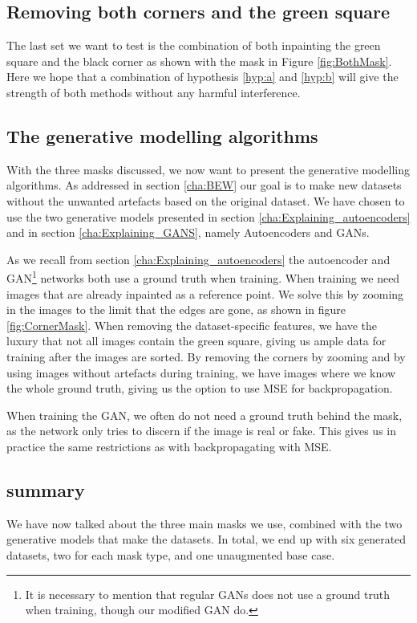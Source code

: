 \subsection{Removing both corners and the green square}
The last set we want to test is the combination of both inpainting the green square and the black corner as shown with the mask in Figure \ref{fig:BothMask}. 
Here we hope that a combination of hypothesis \ref{hyp:a} and \ref{hyp:b} will give the strength of both methods without any harmful interference. 


\subsection{The generative modelling algorithms}
With the three masks discussed, we now want to present the generative modelling algorithms. As addressed in section \ref{cha:BEW} our goal is to make new datasets without the unwanted artefacts based on the original dataset. 
We have chosen to use the two generative models presented in section \ref{cha:Explaining_autoencoders} and in section \ref{cha:Explaining_GANS}, namely Autoencoders and GANs.


As we recall from section \ref{cha:Explaining_autoencoders} the autoencoder and GAN\footnote{It is necessary to mention that regular GANs does not use a ground truth when training, though our modified GAN do.} networks both use a ground truth when training.
When training we need images that are already inpainted as a reference point. We solve this by zooming in the images to the limit that the edges are gone, as shown in figure \ref{fig:CornerMask}. When removing the dataset-specific features, we have the luxury that not all images contain the green square, giving us ample data for training after the images are sorted.
By removing the corners by zooming and by using images without artefacts during training, we have images where we know the whole ground truth, giving us the option to use MSE for backpropagation.


When training the GAN, we often do not need a ground truth behind the mask, as the network only tries to discern if the image is real or fake. This gives us in practice the same restrictions as with backpropagating with MSE.

\subsection{summary}
We have now talked about the three main masks we use, combined with the two generative models that make the datasets.
In total, we end up with six generated datasets, two for each mask type, and one unaugmented base case.

